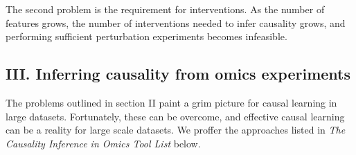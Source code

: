 \documentclass[journal=jacsat,manuscript=article]{achemso}
\begin{document}
The second problem is the requirement for interventions. As the number
of features grows, the number of interventions needed to infer causality
grows, and performing sufficient perturbation experiments becomes
infeasible.


\subsection{III. Inferring causality from omics experiments}

The problems outlined in section II paint a grim picture for causal
learning in large datasets. Fortunately, these can be overcome, and
effective causal learning can be a reality for large scale datasets. We
proffer the approaches listed in \textit{The Causality Inference in Omics Tool List}
below.
\end{document}
